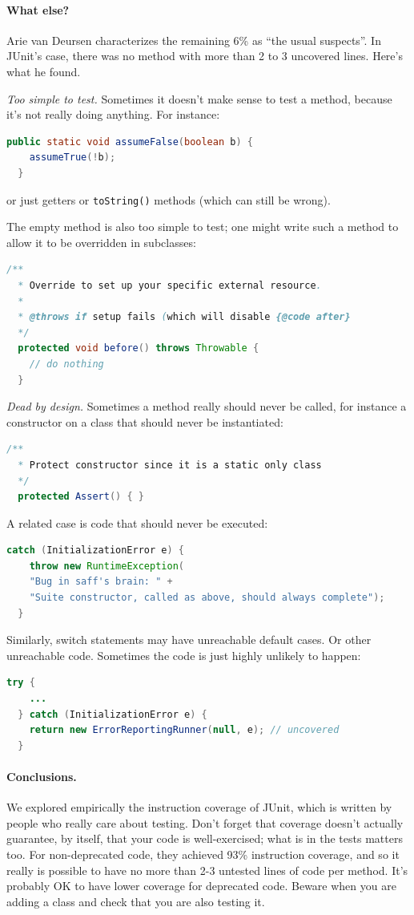 \documentclass[11pt]{article}
\begin{document}
\paragraph{What else?} Arie van Deursen characterizes the remaining 6\% as
``the usual suspects''. In JUnit's case, there was no method with more than
2 to 3 uncovered lines. Here's what he found.

\noindent
\emph{Too simple to test.} Sometimes it doesn't make sense to test a method, because
it's not really doing anything. For instance:
\begin{lstlisting}[language=Java]
  public static void assumeFalse(boolean b) {
    assumeTrue(!b);
  }
\end{lstlisting}
or just getters or {\tt toString()} methods (which can still be wrong).

The empty method is also too simple to test; one might write such a method to allow
it to be overridden in subclasses:
\begin{lstlisting}[language=Java]
  /**
  * Override to set up your specific external resource.
  *
  * @throws if setup fails (which will disable {@code after}
  */
  protected void before() throws Throwable {
    // do nothing
  }
\end{lstlisting}

\noindent \emph{Dead by design.} Sometimes a method really should never be called,
for instance a constructor on a class that should never be instantiated:
\begin{lstlisting}[language=Java]
  /**
  * Protect constructor since it is a static only class
  */
  protected Assert() { }
\end{lstlisting}

A related case is code that should never be executed:
\begin{lstlisting}[language=Java]
  catch (InitializationError e) {
    throw new RuntimeException(
    "Bug in saff's brain: " +
    "Suite constructor, called as above, should always complete");
  }
\end{lstlisting}
Similarly, switch statements may have unreachable default cases. Or other unreachable code.
Sometimes the code is just highly unlikely to happen:
\begin{lstlisting}[language=Java]
  try {
    ...
  } catch (InitializationError e) {
    return new ErrorReportingRunner(null, e); // uncovered
  }
\end{lstlisting}

\paragraph*{Conclusions.} We explored empirically the instruction coverage of JUnit,
which is written by people who really care about testing. Don't forget
that coverage doesn't actually guarantee, by itself, that your code is
well-exercised; what is in the tests matters too. For non-deprecated
code, they achieved 93\% instruction coverage, and so it really is
possible to have no more than 2-3 untested lines of code per
method. It's probably OK to have lower coverage for deprecated
code. Beware when you are adding a class and check that you are also
testing it.
\end{document}

